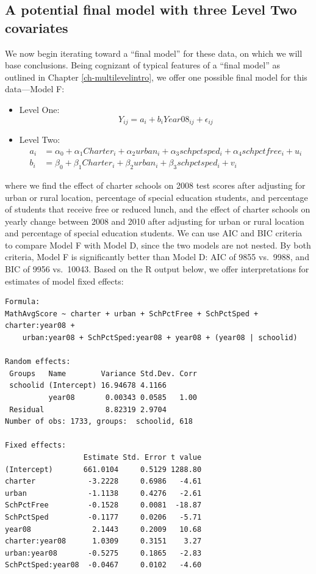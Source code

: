 \documentclass[
]{krantz}
\begin{document}
\hypertarget{modelf9}{%
\subsection{A potential final model with three Level Two covariates}\label{modelf9}}

We now begin iterating toward a ``final model'' for these data, on which we will base conclusions. Being cognizant of typical features of a ``final model'' as outlined in Chapter \ref{ch-multilevelintro}, we offer one possible final model for this data---Model F:

\begin{itemize}
\item
  Level One:
  \begin{equation}
  Y_{ij}= a_{i} + b_{i}Year08_{ij} + \epsilon_{ij}
  \end{equation}
\item
  Level Two:
  \begin{align*}
  a_{i} & = \alpha_{0} + \alpha_{1}Charter_i + \alpha_{2}urban_i + \alpha_{3}schpctsped_i + \alpha_{4}schpctfree_i + u_{i} \\
  b_{i} & = \beta_{0} + \beta_{1}Charter_i + \beta_{2}urban_i + \beta_{3}schpctsped_i + v_{i}
  \end{align*}
\end{itemize}

where we find the effect of charter schools on 2008 test scores after adjusting for urban or rural location, percentage of special education students, and percentage of students that receive free or reduced lunch, and the effect of charter schools on yearly change between 2008 and 2010 after adjusting for urban or rural location and percentage of special education students. We can use AIC and BIC criteria to compare Model F with Model D, since the two models are not nested. By both criteria, Model F is significantly better than Model D: AIC of 9855 vs.~9988, and BIC of 9956 vs.~10043. Based on the R output below, we offer interpretations for estimates of model fixed effects:

\begin{verbatim}
Formula: 
MathAvgScore ~ charter + urban + SchPctFree + SchPctSped + charter:year08 +  
    urban:year08 + SchPctSped:year08 + year08 + (year08 | schoolid)

Random effects:
 Groups   Name        Variance Std.Dev. Corr
 schoolid (Intercept) 16.94678 4.1166       
          year08       0.00343 0.0585   1.00
 Residual              8.82319 2.9704       
Number of obs: 1733, groups:  schoolid, 618

Fixed effects:
                  Estimate Std. Error t value
(Intercept)       661.0104     0.5129 1288.80
charter            -3.2228     0.6986   -4.61
urban              -1.1138     0.4276   -2.61
SchPctFree         -0.1528     0.0081  -18.87
SchPctSped         -0.1177     0.0206   -5.71
year08              2.1443     0.2009   10.68
charter:year08      1.0309     0.3151    3.27
urban:year08       -0.5275     0.1865   -2.83
SchPctSped:year08  -0.0467     0.0102   -4.60
\end{verbatim}
\end{document}
